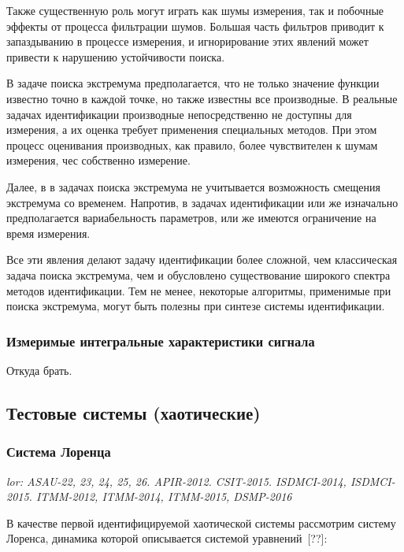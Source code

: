 \documentclass[a4paper,12pt]{article}
\newcommand{\LinkRef}[1]{ \textit{\color{red}#1} }
\begin{document}
Также существенную роль могут играть как шумы измерения, так и побочные
эффекты от процесса фильтрации шумов. Большая часть фильтров приводит к запаздыванию
в процессе измерения, и игнорирование этих явлений может привести
к нарушению устойчивости поиска.

В задаче поиска экстремума предполагается, что не только
значение функции известно точно в каждой точке, но также известны все производные.
В реальные задачах идентификации производные непосредственно
не доступны для измерения, а их оценка требует применения специальных
методов. При этом процесс оценивания производных, как правило,
более чувствителен к шумам измерения, чес собственно измерение.

Далее, в в задачах поиска экстремума не учитывается возможность
смещения экстремума со временем. Напротив, в задачах идентификации
или же изначально предполагается вариабельность параметров, или же
имеются ограничение на время измерения.


Все эти явления делают задачу идентификации более сложной, чем
классическая задача поиска экстремума, чем и обусловлено
существование широкого спектра методов идентификации. Тем не менее,
некоторые алгоритмы, применимые при поиска экстремума, могут быть
полезны при синтезе системы идентификации.






\subsubsection{Измеримые интегральные характеристики сигнала}

Откуда брать.


\subsection{Тестовые системы (хаотические)}

\subsubsection{Система Лоренца} %

\LinkRef{
  lor: ASAU-22, 23, 24, 25, 26. APIR-2012. CSIT-2015. ISDMCI-2014, ISDMCI-2015.
  ITMM-2012, ITMM-2014, ITMM-2015, DSMP-2016
}

В качестве первой идентифицируемой хаотической системы рассмотрим
систему Лоренса, динамика которой описывается системой уравнений~[??]:
\end{document}
